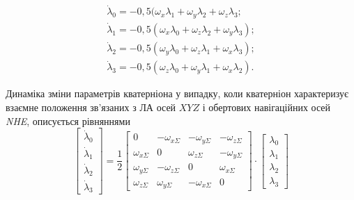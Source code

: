 \[\begin{array}{l} 
{\dot{\lambda}_{0} =-0,5(\omega_{x} \lambda_{1} +\omega_{y} \lambda_{2} +\omega_{z} \lambda_{3} ;} \\ 
{\dot{\lambda}_{1} =-0,5(\omega_{x} \lambda_{0} +\omega_{z} \lambda_{2} +\omega_{y} \lambda_{3});} \\ 
{\dot{\lambda}_{2} =-0,5(\omega_{y} \lambda_{0} +\omega_{z} \lambda_{1} +\omega_{x} \lambda_{3});} \\ 
{\dot{\lambda}_{3} =-0,5(\omega_{z} \lambda_{0} +\omega_{y} \lambda_{1} +\omega_{x} \lambda_{2}).}
\end{array}\] 

Динаміка зміни параметрів кватерніона у випадку, коли кватерніон характеризує взаємне 
положення зв'язаних з ЛА осей $XYZ$ і обертових навігаційних осей \textit{NHE}, описується 
рівняннями
\begin{equation}
 \left[\begin{array}{c} 
{\dot{\lambda }_{0} } \\ 
{\dot{\lambda }_{1} } \\ 
{\dot{\lambda }_{2} } \\ 
{\dot{\lambda }_{3} } 
\end{array}\right]=\frac{1}{2} \left[\begin{array}{cccc}
{0} & {-\omega_{x\Sigma } } & {-\omega_{y\Sigma } } & {-\omega_{z\Sigma } } \\ 
{\omega_{x\Sigma } } & {0} & {\omega_{z\Sigma } } & {-\omega_{y\Sigma } } \\ 
{\omega_{y\Sigma } } & {-\omega_{z\Sigma } } & {0} & {\omega_{x\Sigma } } \\ 
{\omega_{z\Sigma } } & {\omega_{y\Sigma } } & {-\omega_{x\Sigma } } & {0} 
\end{array}
\right]\cdot 
\left[\begin{array}{c} 
{\lambda_{0} } \\ {\lambda_{1} } \\ {\lambda_{2} } \\ {\lambda_{3} } 
\end{array}\right] 
\label{eq:qdiff}
\end{equation}


